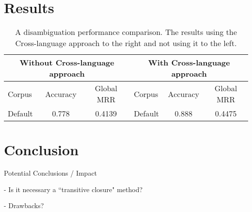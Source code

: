 \documentclass[10pt,a4paper]{llncs}
\begin{document}
\section{Results}

\begin{table}
\centering
    \begin{tabular}{|l|c|c|l|c|c|}
		\hline
		\multicolumn{3}{|c|}{Without Cross-language approach} & \multicolumn{3}{|c|}{With Cross-language approach}   \\ \hline		
    Corpus       & Accuracy     & Global MRR & Corpus       & Accuracy     & Global MRR                \\ \hline
    Default      & 0.778        & 0.4139     & Default      & 0.888        & 0.4475                    \\		
		\hline   		
    \end{tabular}
		\vspace{0.2cm}
    \caption{A disambiguation performance comparison. The results using the Cross-language approach to the right and not using it to the left.}
	  \label{tab:resultsTable}
\end{table}

\section{Conclusion}

Potential Conclusions / Impact

- Is it necessary a ``transitive closure" method?

- Drawbacks?




\end{document}
